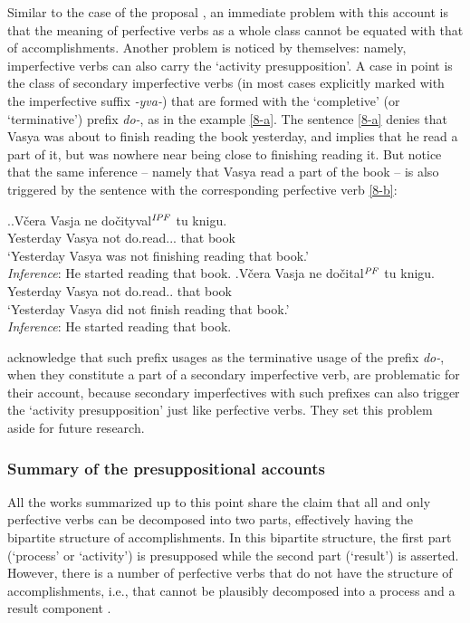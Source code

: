 Similar to the case of the proposal \citet{Romanova:06}, an immediate problem with this account is that the meaning of perfective verbs as a whole class cannot be equated with that of accomplishments. Another problem is noticed by \citet{Docekal:09} themselves: namely, imperfective verbs can also carry the `activity presupposition'. A case in point is the class of secondary imperfective verbs (in most cases explicitly marked with the imperfective suffix \textit{-yva-}) that are formed with the `completive' (or `terminative') prefix \textit{do-}, as in the example \ref{8-a}. The sentence \ref{8-a} denies that Vasya was about to finish reading the book yesterday, and implies that he read a part of it, but was nowhere near being close to finishing reading it. But notice that the same inference -- namely that Vasya read a part of the book -- is also triggered by the sentence with the corresponding perfective verb \ref{8-b}:

\ex.\label{8}\ag.\label{8-a}V\v{c}era Vasja ne do\v{c}ityval$^{\mathit{IPF}}$ tu knigu.\\
Yesterday Vasya not do.read... that book\\
\vspace{0.5em}
`Yesterday Vasya was not finishing reading that book.'\\
\textit{Inference}: He started reading that book.
\bg.\label{8-b}V\v{c}era Vasja ne do\v{c}ital$^{\mathit{PF}}$ tu knigu.\\
Yesterday Vasya not do.read.. that book\\
\vspace{0.5em}
`Yesterday Vasya did not finish reading that book.'\\
\textit{Inference}: He started reading that book.

\citet{Docekal:09} acknowledge that such prefix usages as the terminative usage of the prefix \textit{do-}, when they constitute a part of a secondary imperfective verb, are problematic for their account, because secondary imperfectives with such prefixes can also trigger the `activity presupposition' just like perfective verbs. They set this problem aside for future research. 

\subsubsection{Summary of the presuppositional accounts}
All the works summarized up to this point share the claim that all and only perfective verbs can be decomposed into two parts, effectively having the bipartite structure of accomplishments. In this bipartite structure, the first part (`process' or `activity') is presupposed while the second part (`result') is asserted. However, there is a number of perfective verbs that do not have the structure of accomplishments, i.e., that cannot be plausibly decomposed into a process and a result component \citep[see][and references therein]{Filip:00, FilipRothstein:05}. 

